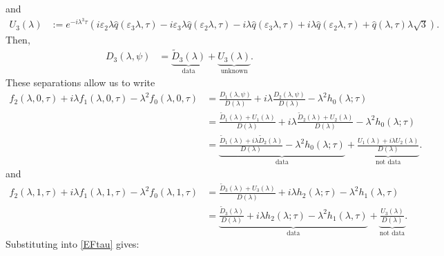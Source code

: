 and 
\begin{align*}
    U_3(\lambda) &:= e^{-i \lambda^3 \tau} (i \varepsilon_2\lambda \widehat{q}(\varepsilon_3\lambda,\tau)  -i \varepsilon_3\lambda\widehat{q}(\varepsilon_2\lambda,\tau) - i\lambda\widehat{q}(\varepsilon_3\lambda,\tau) + i\lambda\widehat{q}(\varepsilon_2\lambda,\tau) + \widehat{q}(\lambda,\tau)\lambda \sqrt{3}).
\end{align*}
Then,
\begin{align*}
    D_3(\lambda,\psi) &= \underbrace{\widetilde{D}_3(\lambda)}_\text{data} + \underbrace{U_3(\lambda)}_\text{unknown}.
\end{align*}
These separations allow us to write 
\begin{align*}
    f_2(\lambda, 0, \tau) + i \lambda f_1(\lambda, 0, \tau) - \lambda^2 f_0(\lambda, 0, \tau) &= \frac{D_1(\lambda, \psi)}{D(\lambda)} + i \lambda \frac{D_2(\lambda, \psi)}{D(\lambda)} - \lambda^2 h_0(\lambda; \tau)\\
    &= \frac{\widetilde{D}_1(\lambda) + U_1(\lambda)}{D(\lambda)} + i \lambda \frac{\widetilde{D}_2(\lambda) + U_2(\lambda)}{D(\lambda)} - \lambda^2 h_0(\lambda; \tau)\\
    &= \underbrace{\frac{\widetilde{D}_1(\lambda)+i \lambda\widetilde{D}_2(\lambda)}{D(\lambda)} - \lambda^2 h_0(\lambda; \tau)}_\text{data} + \underbrace{\frac{U_1(\lambda) + i \lambda  U_2(\lambda)}{D(\lambda)}}_\text{not data}.
\end{align*}
and
\begin{align*}
    f_2(\lambda, 1, \tau) + i \lambda f_1(\lambda, 1, \tau) - \lambda^2 f_0(\lambda, 1, \tau) &= \frac{\widetilde{D}_3(\lambda) + U_3(\lambda)}{D(\lambda)} + i \lambda h_2(\lambda; \tau) - \lambda^2 h_1(\lambda, \tau) \\
    &=\underbrace{\frac{\widetilde{D}_3(\lambda)}{D(\lambda)} + i \lambda h_2(\lambda; \tau) - \lambda^2 h_1(\lambda, \tau)}_\text{data} + \underbrace{\frac{U_3(\lambda)}{D(\lambda)}}_\text{not data}.
\end{align*}
Substituting into \eqref{EFtau} gives: 
